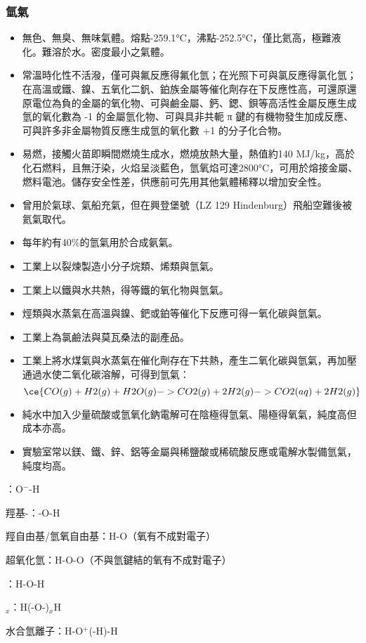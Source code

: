 \documentclass[a4paper,12pt]{report}
\begin{document}
\subsubsection{氫氣}
\begin{itemize}
\item 無色、無臭、無味氣體。熔點-259.1°C，沸點-252.5°C，僅比氦高，極難液化。難溶於水。密度最小之氣體。
\item 常溫時化性不活潑，僅可與氟反應得氟化氫；在光照下可與氯反應得氯化氫；在高溫或鐵、鎳、五氧化二釩、鉑族金屬等催化劑存在下反應性高，可還原還原電位為負的金屬的氧化物、可與鹼金屬、鈣、鍶、鋇等高活性金屬反應生成氫的氧化數為 -1 的金屬氫化物、可與具非共軛 π 鍵的有機物發生加成反應、可與許多非金屬物質反應生成氫的氧化數 +1 的分子化合物。
\item 易燃，接觸火苗即瞬間燃燒生成水，燃燒放熱大量，熱值約140 MJ/kg，高於化石燃料，且無汙染，火焰呈淡藍色，氫氧焰可達2800°C，可用於熔接金屬、燃料電池。儲存安全性差，供應前可先用其他氣體稀釋以增加安全性。
\item 曾用於氣球、氣船充氣，但在興登堡號（LZ 129 Hindenburg）飛船空難後被氦氣取代。
\item 每年約有40\%的氫氣用於合成氨氣。
\item 工業上以裂煉製造小分子烷類、烯類與氫氣。
\item 工業上以鐵與水共熱，得等鐵的氧化物與氫氣。
\item 烴類與水蒸氣在高溫與鎳、鈀或鉑等催化下反應可得一氧化碳與氫氣。
\item 工業上為氯鹼法與莫瓦桑法的副產品。
\item 工業上將水煤氣與水蒸氣在催化劑存在下共熱，產生二氧化碳與氫氣，再加壓通過水使二氧化碳溶解，可得到氫氣：
\[\ce{CO(g) + H2(g) + H2O(g) -> CO2(g) + 2H2(g) -> CO2(aq) + 2H2(g)}\]
\item 純水中加入少量硫酸或氫氧化鈉電解可在陰極得氫氣、陽極得氧氣，純度高但成本亦高。
\item 實驗室常以鎂、鐵、鋅、鋁等金屬與稀鹽酸或稀硫酸反應或電解水製備氫氣，純度均高。
\end{itemize}
\bit
\item {}：O$^-$-H
\item 羥基-：-O-H
\item 羥自由基/氫氧自由基：H-O（氧有不成對電子）
\item 超氧化氫：H-O-O（不與氫鍵結的氧有不成對電子）
\item {}：H-O-H
\item {}$_x$：H(-O-)$_x$H
\item 水合氫離子：H-O$^+$(-H)-H
\end{document}
